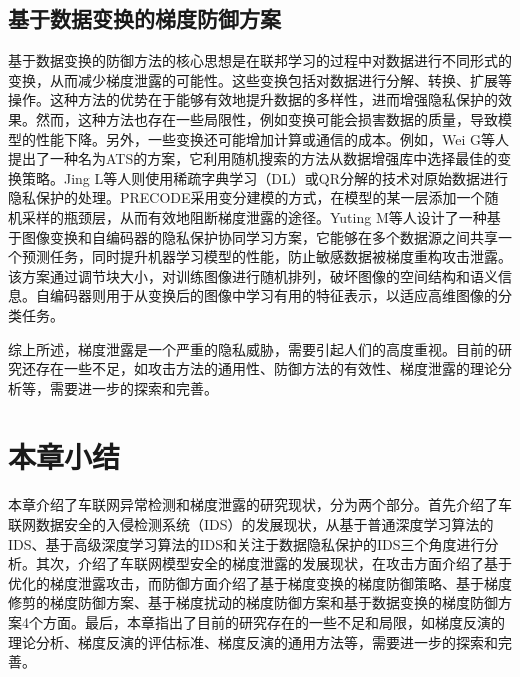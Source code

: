 \subsection{基于数据变换的梯度防御方案}

基于数据变换的防御方法的核心思想是在联邦学习的过程中对数据进行不同形式的变换，从而减少梯度泄露的可能性。这些变换包括对数据进行分解、转换、扩展等操作。这种方法的优势在于能够有效地提升数据的多样性，进而增强隐私保护的效果。然而，这种方法也存在一些局限性，例如变换可能会损害数据的质量，导致模型的性能下降。另外，一些变换还可能增加计算或通信的成本。例如，Wei G等人\cite{Automatic_Transformation_Search_Against_Deep_Leakage_From_Gradients}提出了一种名为ATS的方案，它利用随机搜索的方法从数据增强库中选择最佳的变换策略。Jing L等人\cite{Safeguard_the_Original_Data_in_Federated_Learning_via_Data_Decomposition}则使用稀疏字典学习（DL）或QR分解的技术对原始数据进行隐私保护的处理。PRECODE\cite{PRECODE_A_Generic_Model_Extension_to_Prevent_Deep_Gradient_Leakage}采用变分建模的方式，在模型的某一层添加一个随机采样的瓶颈层，从而有效地阻断梯度泄露的途径。Yuting M等人\cite{Privacy-preserving_Collaborative_Learning_with_Scalable_Image_Transformation_and_Autoencoder}设计了一种基于图像变换和自编码器的隐私保护协同学习方案，它能够在多个数据源之间共享一个预测任务，同时提升机器学习模型的性能，防止敏感数据被梯度重构攻击泄露。该方案通过调节块大小，对训练图像进行随机排列，破坏图像的空间结构和语义信息。自编码器则用于从变换后的图像中学习有用的特征表示，以适应高维图像的分类任务。

综上所述，梯度泄露是一个严重的隐私威胁，需要引起人们的高度重视。目前的研究还存在一些不足，如攻击方法的通用性、防御方法的有效性、梯度泄露的理论分析等，需要进一步的探索和完善。

\section{本章小结}

本章介绍了车联网异常检测和梯度泄露的研究现状，分为两个部分。首先介绍了车联网数据安全的入侵检测系统（IDS）的发展现状，从基于普通深度学习算法的IDS、基于高级深度学习算法的IDS和关注于数据隐私保护的IDS三个角度进行分析。其次，介绍了车联网模型安全的梯度泄露的发展现状，在攻击方面介绍了基于优化的梯度泄露攻击，而防御方面介绍了基于梯度变换的梯度防御策略、基于梯度修剪的梯度防御方案、基于梯度扰动的梯度防御方案和基于数据变换的梯度防御方案4个方面。最后，本章指出了目前的研究存在的一些不足和局限，如梯度反演的理论分析、梯度反演的评估标准、梯度反演的通用方法等，需要进一步的探索和完善。